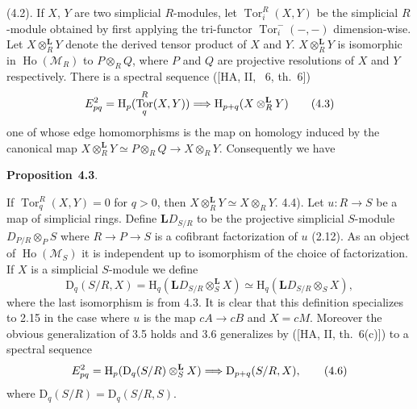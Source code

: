 \documentclass[10pt,reqno]{amsart}
\DeclareMathOperator{\Tor}{Tor}
\DeclareMathOperator{\Ho}{Ho}
\newenvironment{prop}[1]{
\par\medskip\noindent\textbf{Proposition}~\textbf{#1}.\,\itshape
}
\newcommand{\Lra}{\Longrightarrow}
\newcommand{\cat}{\mathcal}
\newcommand{\M}{\cat{M}}
\renewcommand{\L}{\mathbf{L}}
\renewcommand{\H}{\mathrm{H}}
\newcommand{\D}{\mathrm{D}}
\begin{document}
(4.2). If $X$, $Y$ are two simplicial $R$-modules, let $\Tor_i^R(X,Y)$ be the simplicial $R$-module
obtained by first applying the tri-functor $\Tor_i^-(-,-)$ dimension-wise. Let $X\otimes_R^\L Y$ denote
the derived tensor product of $X$ and $Y$. $X\otimes_R^\L Y$ is isomorphic in $\Ho(\M_R)$ to
$P\otimes_R Q$, where $P$ and $Q$ are projective resolutions of $X$ and $Y$ respectively. There is a
spectral sequence ([HA, II, \textsection~6, th.~6])
\[
  E_{pq}^2=\H_p(\Tor_q^R(X,Y))\Lra\H_{p+q}(X\otimes_R^\L Y)\tag{4.3}
\]
one of whose edge homomorphisms is the map on homology induced by the canonical map
$X\otimes_R^\L Y\simeq P\otimes_R Q\to X\otimes_R Y$. Consequently we have

\begin{prop}{4.3}
If $\Tor_q^R(X,Y)=0$ for $q>0$, then $X\otimes_R^\L Y\simeq X\otimes_R Y$.
\end{prop}

(4.4). Let $u:R\to S$ be a map of simplicial rings. Define $\L D_{S/R}$ to be the projective
simplicial $S$-module $D_{P/R}\otimes_P S$ where $R\to P\to S$ is a cofibrant factorization of $u$
(2.12). As an object of $\Ho(\M_S)$ it is independent up to isomorphism of the choice of factorization.
If $X$ is a simplicial $S$-module we define
\[
  \D_q(S/R,X)=\H_q(\L D_{S/R}\otimes_S^\L X)\simeq\H_q(\L D_{S/R}\otimes_S X),\tag{4.5}
\]
where the last isomorphism is from 4.3. It is clear that this definition specializes to 2.15
in the case where $u$ is the map $cA\to cB$ and $X=cM$. Moreover the obvious generalization of 3.5
holds and 3.6 generalizes by ([HA, II, th.~6(c)]) to a spectral sequence
\[
  E_{pq}^2=\H_p(\D_q(S/R)\otimes_S^\L X)\Lra\D_{p+q}(S/R,X),\tag{4.6}
\]
where $\D_q(S/R)=\D_q(S/R,S)$.
\end{document}
